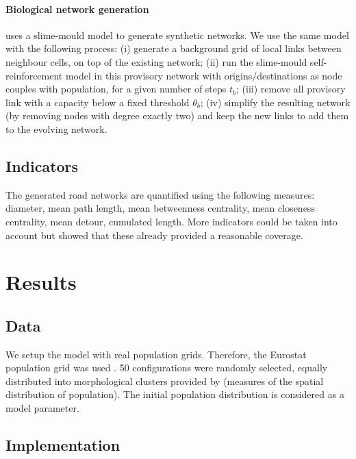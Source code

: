 \documentclass{article}
\begin{document}
\paragraph{Biological network generation}

\cite{raimbault2018systemes} uses a slime-mould model to generate synthetic networks. We use the same model with the following process: (i) generate a background grid of local links between neighbour cells, on top of the existing network; (ii) run the slime-mould self-reinforcement model in this provisory network with origins/destinations as node couples with population, for a given number of steps $t_b$; (iii) remove all provisory link with a capacity below a fixed threshold $\theta_b$; (iv) simplify the resulting network (by removing nodes with degree exactly two) and keep the new links to add them to the evolving network.



\subsection{Indicators}  

  
The generated road networks are quantified using the following measures: diameter, mean path length, mean betweenness centrality, mean closeness centrality, mean detour, cumulated length. More indicators could be taken into account but \cite{raimbault2019urban} showed that these already provided a reasonable coverage.
  
  
\section{Results}
 
\subsection{Data}
  
We setup the model with real population grids. Therefore, the Eurostat population grid was used \cite{batista2013high}. 50 configurations were randomly selected, equally distributed into morphological clusters provided by \cite{raimbault2018multi} (measures of the spatial distribution of population). The initial population distribution is considered as a model parameter.
  
\subsection{Implementation} 
\end{document}
